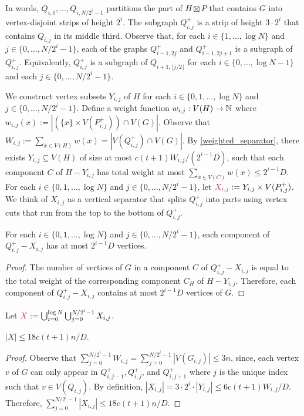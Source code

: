 \documentclass{patmorin}
\makeatletter
\renewcommand{\le}{\leqslant}
\def\mathcolor#1#{\@mathcolor{#1}}
\def\@mathcolor#1#2#3{%
  \protect\leavevmode
  \begingroup
    \color#1{#2}#3%
  \endgroup
}
\newcommand{\mathdefin}[1]{\mathcolor{brightmaroon}{#1}}
\makeatother
\begin{document}
In words, $Q_{i,0},\ldots,Q_{i,N/2^i-1}$ partitions the part of $H\boxtimes P$ that contains $G$ into vertex-disjoint strips of height $2^i$. The subgraph $Q^+_{i,j}$ is a strip of height $3\cdot 2^i$ that contains $Q_{i,j}$ in its middle third.  Observe that, for each $i\in\{1,\ldots,\log N\}$ and $j\in\{0,\ldots,N/2^i-1\}$, each of the graphs $Q^+_{i-1,2j}$ and $Q^+_{i-1,2j+1}$ is a subgraph of $Q^+_{i,j}$. Equivalently, $Q^+_{i,j}$ is a subgraph of $Q_{i+1,\lfloor j/2\rfloor}$ for each $i\in\{0,\ldots,\log N-1\}$ and each $j\in\{0,\ldots,N/2^i-1\}$.

We construct vertex subsets $Y_{i,j}$ of $H$ for each $i\in\{0,1,\ldots,\log N\}$ and $j\in\{0,\ldots,N/2^{i}-1\}$.  Define a weight function $w_{i,j}:V(H)\to\mathbb{N}$ where $w_{i,j}(x):=|(\{x\}\times V(P^+_{i,j})) \cap V(G)|$.  Observe that $W_{i,j}:=\sum_{x\in V(H)} w(x)=|V(Q^+_{i,j})\cap V(G)|$. By \cref{weighted_separator}, there exists $Y_{i,j}\subseteq V(H)$ of size at most $c(t+1)W_{i,j}/(2^{i-1}D)$, such that each component $C$ of $H-Y_{i,j}$ has total weight at most $\sum_{x\in V(C)} w(x) \le 2^{i-1}D$.  For each $i\in\{0,1,\ldots,\log N\}$ and $j\in\{0,\ldots,N/2^{i}-1\}$, let $\mathdefin{X_{i,j}}:=Y_{i,j}\times V(P^+_{i,j})$.  We think of $X_{i,j}$ as a vertical separator that splits $Q^+_{i,j}$ into parts using vertex cuts that run from the top to the bottom of $Q^+_{i,j}$.

\begin{lem}
  For each $i\in\{0,1,\ldots,\log N\}$ and $j\in\{0,\ldots,N/2^{i}-1\}$, each component of $Q^+_{i,j}-X_{i,j}$ has at most $2^{i-1}D$ vertices.\
\end{lem}

\begin{proof}
  The number of vertices of $G$ in a component $C$ of $Q^+_{i,j}-X_{i,j}$ is equal to the total weight of the corresponding component $C_H$ of $H-Y_{i,j}$.  Therefore, each component of $Q^+_{i,j}-X_{i,j}$ contains at most $2^{i-1}D$ vertices of $G$.
\end{proof}

Let $\mathdefin{X}:=\bigcup_{i=0}^{\log N}\bigcup_{j=0}^{N/2^i-1} X_{i,j}$.

\begin{lem}
  $|X|\le 18c(t+1)n/D$.
\end{lem}

\begin{proof}
  Observe that $\sum_{j=0}^{N/2^i-1} W_{i,j}=\sum_{j=0}^{N/2^i-1} |V(G_{i,j})| \le 3n$, since, each vertex $v$ of $G$ can only appear in $Q^+_{i,j-1}, Q^+_{i,j}$, and $Q^+_{i,j+1}$ where $j$ is the unique index such that $v\in V(Q_{i,j})$.    By definition, $|X_{i,j}|=3\cdot 2^i \cdot |Y_{i,j}| \le 6c(t+1)W_{i,j}/D$.  Therefore, $\sum_{j=0}^{N/2^i-1} |X_{i,j}|\le 18c(t+1)n/D$.
\end{proof}
\end{document}
